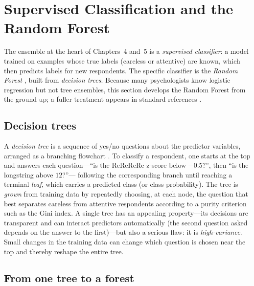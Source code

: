\section{Supervised Classification and the Random Forest}
\label{sec:rf}

The ensemble at the heart of Chapters~4 and~5 is a \emph{supervised classifier}:
a model trained on examples whose true labels (careless or attentive) are known,
which then predicts labels for new respondents. The specific classifier is the
\emph{Random Forest} \parencite{breiman2001random}, built from \emph{decision
trees}. Because many psychologists know logistic regression but not tree
ensembles, this section develops the Random Forest from the ground up; a fuller
treatment appears in standard references \parencite{hastie2009elements,
james2013introduction}.

\subsection{Decision trees}

A \emph{decision tree} is a sequence of yes/no questions about the predictor
variables, arranged as a branching flowchart \parencite{breiman1984cart}. To
classify a respondent, one starts at the top and answers each question---``is
the ReReReRe z-score below $-0.5$?'', then ``is the longstring above $12$?''---
following the corresponding branch until reaching a terminal \emph{leaf}, which
carries a predicted class (or class probability). The tree is \emph{grown} from
training data by repeatedly choosing, at each node, the question that best
separates careless from attentive respondents according to a purity criterion
such as the Gini index. A single tree has an appealing property---its decisions
are transparent and can interact predictors automatically (the second question
asked depends on the answer to the first)---but also a serious flaw: it is
\emph{high-variance}. Small changes in the training data can change which
question is chosen near the top and thereby reshape the entire tree.

\subsection{From one tree to a forest}

